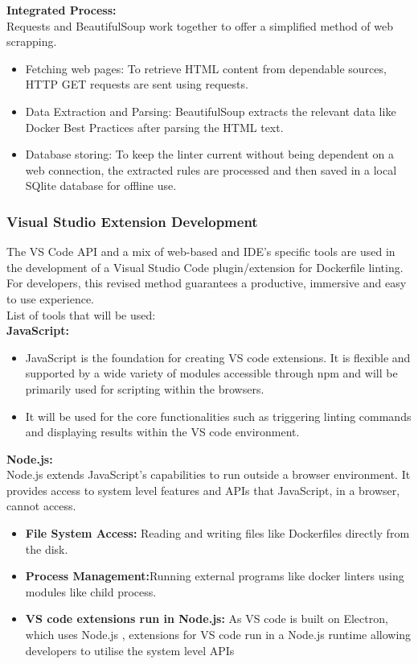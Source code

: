 \textbf{Integrated Process:}
\\Requests and BeautifulSoup work together to offer a simplified method of web scrapping. 
\begin{itemize}
    \item Fetching web pages: To retrieve HTML content from dependable sources, HTTP GET requests are sent using requests. 
    \item Data Extraction and Parsing: BeautifulSoup extracts the relevant data like Docker Best Practices after parsing the HTML text. 
    \item Database storing: To keep the linter current without being dependent on a web connection, the extracted rules are processed and then saved in a local SQlite database for offline use. 
\end{itemize}

\subsubsection{Visual Studio Extension Development}
The VS Code API and a mix of web-based and IDE's specific tools are used in the development of a Visual Studio Code plugin/extension for Dockerfile linting.\\For developers, this revised method guarantees a productive, immersive and easy to use experience.\\List of tools that will be used: \\
\textbf{JavaScript:}
\begin{itemize}
    \item JavaScript is the foundation for creating VS code extensions. It is flexible and supported by a wide variety of modules accessible through npm and will be primarily used for scripting within the browsers. 
    \item It will be used for the core functionalities such as triggering linting commands and displaying results within the VS code environment. 
\end{itemize}
\textbf{Node.js:}
\\Node.js extends JavaScript's capabilities to run outside a browser environment. 
It provides access to system level features and APIs that JavaScript, in a browser, cannot access. 
\begin{itemize}
    \item \textbf{File System Access:} Reading and writing files like Dockerfiles directly from the disk. 
    \item \textbf{Process Management:}Running external programs like docker linters using modules like child process.
    \item \textbf{VS code extensions run in Node.js:} As VS code is built on Electron, which uses Node.js , extensions for VS code run in a Node.js runtime allowing developers to utilise the system level APIs
\end{itemize}

